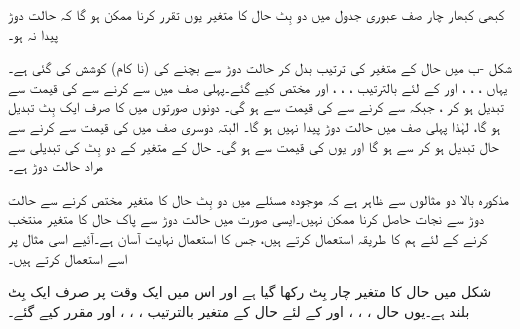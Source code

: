 کبھی کبھار چار صف عبوری جدول میں دو بِٹ حال کا متغیر یوں تقرر کرنا ممکن ہو گا کہ حالت دوڑ پیدا نہ ہو۔

شکل  -ب میں حال کے متغیر کی ترتیب بدل کر حالت دوڑ سے بچنے کی (نا کام) کوشش کی گئی ہے۔ یہاں ، ، ، اور  کے لئے بالترتیب ، ، ، اور  مختص کیے گئے۔پہلی صف میں سے  کرنے سے  کی قیمت  سے تبدیل ہو کر  ، جبکہ  سے  کرنے سے  کی قیمت  سے  ہو گی۔ دونوں صورتوں میں  کا صرف ایک بِٹ تبدیل ہو گا، لہٰذا پہلی صف میں حالت دوڑ پیدا نہیں ہو گا۔ البتہ دوسری صف میں  کی قیمت  سے  کرنے سے حال تبدیل ہو کر  سے  ہو گا اور یوں  کی قیمت  سے  ہو گی۔ حال کے متغیر کے دو بِٹ کی تبدیلی سے مراد حالت دوڑ ہے۔

مذکورہ بالا دو مثالوں سے ظاہر ہے کہ موجودہ مسئلے میں دو بِٹ حال کا متغیر مختص کرنے سے حالت دوڑ سے نجات حاصل کرنا ممکن نہیں۔ایسی صورت میں حالت دوڑ سے پاک حال کا متغیر منتخب کرنے کے لئے ہم  کا طریقہ استعمال کرتے ہیں، جس کا استعمال نہایت آسان ہے۔آئیے اسی مثال پر اسے استعمال کرتے ہیں۔

شکل  میں حال کا متغیر چار بِٹ رکھا گیا ہے اور اس میں ایک وقت پر صرف ایک بِٹ بلند ہے۔یوں حال  ، ، ، اور  کے لئے حال کے متغیر بالترتیب ، ، ، اور  مقرر کیے گئے۔

